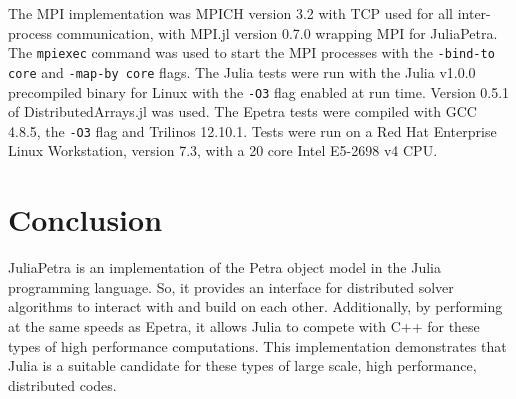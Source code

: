 \documentclass[acmsmall]{acmart}
\begin{document}
	The MPI implementation was MPICH version 3.2 with TCP used for all inter-process communication, with MPI.jl version 0.7.0 wrapping MPI for JuliaPetra.
	The \texttt{mpiexec} command was used to start the MPI processes with the \texttt{-bind-to core} and \texttt{-map-by core} flags.
	The Julia tests were run with the Julia v1.0.0 precompiled binary for Linux with the \texttt{-O3} flag enabled at run time.
	Version 0.5.1 of DistributedArrays.jl was used.
	The Epetra tests were compiled with GCC 4.8.5, the \texttt{-O3} flag and Trilinos 12.10.1.
	Tests were run on a Red Hat Enterprise Linux Workstation, version 7.3,
	with a 20 core Intel E5-2698 v4 CPU.
	
	\section{Conclusion}
	
	JuliaPetra is an implementation of the Petra object model in the Julia programming language.
	So, it provides an interface for distributed solver algorithms to interact with and build on each other.
	Additionally, by performing at the same speeds as Epetra,
	it allows Julia to compete with C++ for these types of high performance computations.
	This implementation demonstrates that Julia is a suitable candidate for these types of large scale, high performance, distributed codes.
	
	
	
\end{document}
